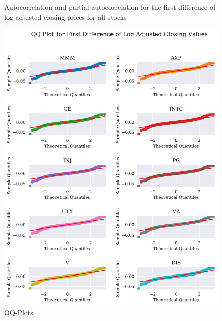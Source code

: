 \begin{figure}[H]
    \centering
    \begin{adjustbox}{width=.9\textwidth,center}
    
    \end{adjustbox}  
    \caption{Autocorrelation and partial autocorrelation for the first difference of log adjusted closing prices for all stocks}
    \label{fig:all_autocorr_fd_log_adjclose}
\end{figure}{}


\begin{figure}[h]
    \centering
    \begin{adjustbox}{width=.9\textwidth,center}
    \includegraphics[]{figures/all_qq_plot_fd_log_adjclose.pdf}
    \end{adjustbox}  
    \caption{QQ-Plots}
    \label{fig:all_qq_fd_log_adjclose}
\end{figure}{}



